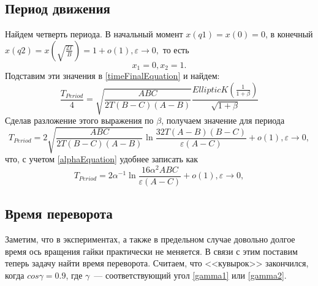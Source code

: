 \documentclass{article}
\begin{document}
\subsection{Период движения}
Найдем четверть периода. В начальный момент \begin{math} x(q1)=x(0)=0 \end{math}, в конечный \begin{math} x(q2)=x(\sqrt{\frac{2T}{B}})=1+o(1),\varepsilon\rightarrow 0, \end{math} то есть
\begin{equation}
x_1=0, x_2=1.
\end{equation}
Подставим эти значения в \ref{timeFinalEquation} и найдем:
\begin{equation}
\frac{T_{Period}}{4}=\sqrt{\frac{ABC}{2T(B-C)(A-B)}}\frac{EllipticK(\frac{1}{1 + \beta})}{\sqrt{1 + \beta}}
\end{equation}
Сделав разложение этого выражения по \begin{math} \beta \end{math}, получаем значение для периода
\begin{equation}
T_{Period}=2\sqrt{\frac{ABC}{2T(B-C)(A-B)}}\ln{\frac{32T(A-B)(B-C)}{\varepsilon(A-C)}}+o(1),\varepsilon\rightarrow 0,
\end{equation}
что, с учетом \ref{alphaEquation} удобнее записать как
\begin{equation}
T_{Period}=2\alpha^{-1}\ln{\frac{16\alpha^2ABC}{\varepsilon(A-C)}}+o(1),\varepsilon\rightarrow 0,
\end{equation}

\subsection{Время переворота}
Заметим, что в экспериментах, а также в предельном случае довольно долгое время ось вращения гайки практически не меняется. В связи с этим поставим теперь задачу найти время переворота. Считаем, что <<кувырок>> закончился, когда \begin{math} cos\gamma=0.9 \end{math}, где \begin{math} \gamma \end{math}~--- соответствующий угол \ref{gamma1} или \ref{gamma2}.
\end{document}

